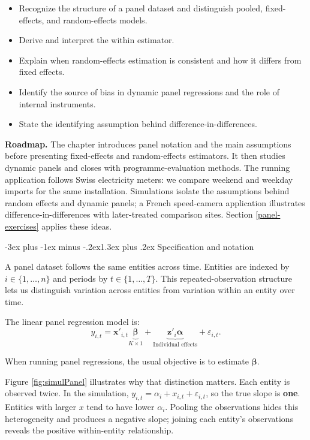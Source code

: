 \documentclass[
  11pt,
]{book}
\makeatletter
\providecommand{\tightlist}{%
  \setlength{\itemsep}{0pt}\setlength{\parskip}{0pt}}
\renewcommand\section{\@startsection{section}{1}{\z@}
  {-3ex plus -1ex minus -.2ex}{1.3ex plus .2ex}
  {\normalfont\Large\bfseries\color{TextbookInk}}}
\theoremstyle{definition}
\theoremstyle{definition}
\theoremstyle{definition}
\theoremstyle{definition}
\theoremstyle{remark}
\makeatother
\begin{document}
\begin{itemize}
\tightlist
\item
  Recognize the structure of a panel dataset and distinguish pooled, fixed-effects, and random-effects models.
\item
  Derive and interpret the within estimator.
\item
  Explain when random-effects estimation is consistent and how it differs from fixed effects.
\item
  Identify the source of bias in dynamic panel regressions and the role of internal instruments.
\item
  State the identifying assumption behind difference-in-differences.
\end{itemize}

\textbf{Roadmap.} The chapter introduces panel notation and the main assumptions before presenting fixed-effects and random-effects estimators. It then studies dynamic panels and closes with programme-evaluation methods. The running application follows Swiss electricity meters: we compare weekend and weekday imports for the same installation. Simulations isolate the assumptions behind random effects and dynamic panels; a French speed-camera application illustrates difference-in-differences with later-treated comparison sites. Section \ref{panel-exercises} applies these ideas.

\section{Specification and notation}\label{specification-and-notation}

A panel dataset follows the same entities across time. Entities are indexed by \(i\in\{1,\dots,n\}\) and periods by \(t\in\{1,\dots,T\}\). This repeated-observation structure lets us distinguish variation across entities from variation within an entity over time.

The linear panel regression model is:
\begin{equation}
y_{i,t} = \mathbf{x}'_{i,t}\underbrace{\boldsymbol\beta}_{K \times 1} + \underbrace{\mathbf{z}'_{i}\boldsymbol\alpha}_{\mbox{Individual effects}} + \varepsilon_{i,t}.\label{eq:panel1}
\end{equation}

When running panel regressions, the usual objective is to estimate \(\boldsymbol\beta\).

Figure \ref{fig:simulPanel} illustrates why that distinction matters. Each entity is observed twice. In the simulation, \(y_{i,t}=\alpha_i+x_{i,t}+\varepsilon_{i,t}\), so the true slope is \textbf{one}. Entities with larger \(x\) tend to have lower \(\alpha_i\). Pooling the observations hides this heterogeneity and produces a negative slope; joining each entity's observations reveals the positive within-entity relationship.
\end{document}
